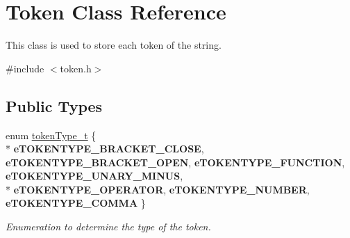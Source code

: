 \hypertarget{class_token}{}\section{Token Class Reference}
\label{class_token}


This class is used to store each token of the string.  




{\ttfamily \#include $<$token.\+h$>$}

\subsection*{Public Types}
\begin{DoxyCompactItemize}
\item 
\hypertarget{class_token_af5797fcd4cb63823f3108625cbb83d11}{}enum \hyperlink{class_token_af5797fcd4cb63823f3108625cbb83d11}{token\+Type\+\_\+t} \{ \\*
{\bfseries e\+T\+O\+K\+E\+N\+T\+Y\+P\+E\+\_\+\+B\+R\+A\+C\+K\+E\+T\+\_\+\+C\+L\+O\+S\+E}, 
{\bfseries e\+T\+O\+K\+E\+N\+T\+Y\+P\+E\+\_\+\+B\+R\+A\+C\+K\+E\+T\+\_\+\+O\+P\+E\+N}, 
{\bfseries e\+T\+O\+K\+E\+N\+T\+Y\+P\+E\+\_\+\+F\+U\+N\+C\+T\+I\+O\+N}, 
{\bfseries e\+T\+O\+K\+E\+N\+T\+Y\+P\+E\+\_\+\+U\+N\+A\+R\+Y\+\_\+\+M\+I\+N\+U\+S}, 
\\*
{\bfseries e\+T\+O\+K\+E\+N\+T\+Y\+P\+E\+\_\+\+O\+P\+E\+R\+A\+T\+O\+R}, 
{\bfseries e\+T\+O\+K\+E\+N\+T\+Y\+P\+E\+\_\+\+N\+U\+M\+B\+E\+R}, 
{\bfseries e\+T\+O\+K\+E\+N\+T\+Y\+P\+E\+\_\+\+C\+O\+M\+M\+A}
 \}\label{class_token_af5797fcd4cb63823f3108625cbb83d11}

\begin{DoxyCompactList}\small\item\em Enumeration to determine the type of the token. \end{DoxyCompactList}\end{DoxyCompactItemize}
